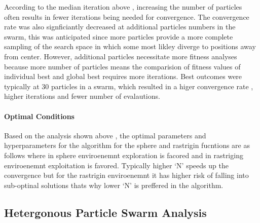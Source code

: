 \documentclass[
]{article}
\begin{document}
According to the median iteration above , increasing the number of
particles often results in fewer iterations being needed for
convergence. The convergence rate was also signficiantly decreased at
additional particles numbers in the swarm, this was anticipated since
more particles provide a more complete sampling of the search space in
which some most likley diverge to positions away from center. However,
additional particles necessitate more fitness analyses because more
number of particles means the comparision of fitness values of
individual best and global best requires more iterations. Best outcomes
were typically at 30 particles in a swarm, which resulted in a higer
convergence rate , higher iterations and fewer number of evalautions.

\hypertarget{optimal-conditions}{%
\paragraph{Optimal Conditions}\label{optimal-conditions}}

\begin{table}[H]
\centering
{}
\end{table}

Based on the analysis shown above , the optimal parameters and
hyperparameters for the algorithm for the sphere and rastrigin fucntions
are as follows where in sphere enviroenemnt exploration is facored and
in rastriging enviroenemnt exploitation is favored. Typically higher `N'
speeds up the convergence but for the rastrigin enviroenemnt it has
higher risk of falling into sub-optinal solutions thats why lower `N' is
preffered in the algorithm.

\newpage

\hypertarget{hetergonous-particle-swarm-analysis}{%
\subsection{Hetergonous Particle Swarm
Analysis}\label{hetergonous-particle-swarm-analysis}}

\newpage
\end{document}

